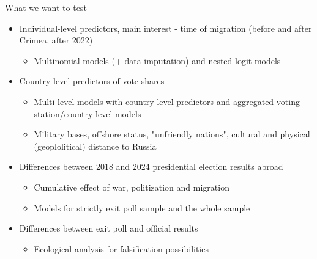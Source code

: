 \documentclass[xcolor=dvipsnames, 10pt]{beamer}
\begin{document}
	\begin{frame}{What we want to test}
	\begin{itemize}
		\item Individual-level predictors, main interest - time of migration (before and after Crimea, after 2022)
		\begin{itemize}
			\item Multinomial models (+ data imputation) and nested logit models
		\end{itemize}
		\item Country-level predictors of vote shares
		\begin{itemize}
			\item Multi-level models with country-level predictors and aggregated voting station/country-level models
			\item Military bases, offshore status, "unfriendly nations", cultural and physical (geoplolitical) distance to Russia
		\end{itemize}
		\item Differences between 2018 and 2024 presidential election results abroad 
		\begin{itemize}
			\item Cumulative effect of war, politization and migration
			\item Models for strictly exit poll sample and the whole sample
		\end{itemize}
		\item Differences between exit poll and official results
		\begin{itemize}
			\item Ecological analysis for falsification possibilities
		\end{itemize}
	\end{itemize}
	\end{frame}
\end{document}

